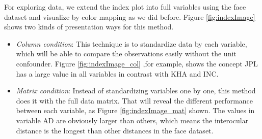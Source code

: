 \documentclass[article]{jss}
\begin{document}
For exploring data, we extend the index plot into full variables using the face dataset and visualize by color mapping as we did before. Figure \ref{fig:indexImage} shows two kinds of presentation ways for this method.

\begin{itemize}
  \item \emph{Column condition}: This technique is to standardize data by each variable, which will be able to compare the observations easily without the unit confounder. Figure \ref{fig:indexImage_col} ,for example, shows the concept JPL has a large value in all variables in contrast with KHA and INC.
  \item \emph{Matrix condition}: Instead of standardizing variables one by one, this method does it with the full data matrix. That will reveal the different performance between each variable, as Figure \ref{fig:indexImage_mat} shown. The values in variable AD are obviously larger than others, which means the interocular distance is the longest than other distances in the face dataset.
\end{itemize}
\end{document}
